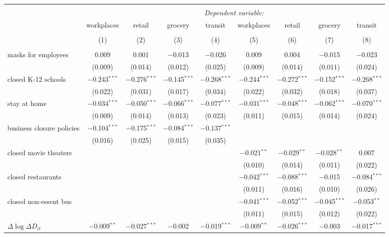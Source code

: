\begin{tabular}{@{\extracolsep{1pt}}lcccccccc} 
\\[-1.8ex]\hline 
\hline \\[-1.8ex] 
 & \multicolumn{8}{c}{\textit{Dependent variable:}} \\ 
\cline{2-9} 
 & workplaces & retail & grocery & transit & workplaces & retail & grocery & transit \\ 
\\[-1.8ex] & (1) & (2) & (3) & (4) & (5) & (6) & (7) & (8)\\ 
\hline \\[-1.8ex] 
 masks for employees & 0.009 & 0.001 & $-$0.013 & $-$0.026 & 0.009 & 0.004 & $-$0.015 & $-$0.023 \\ 
  & (0.009) & (0.014) & (0.012) & (0.025) & (0.009) & (0.014) & (0.011) & (0.024) \\ 
  closed K-12 schools & $-$0.243$^{***}$ & $-$0.276$^{***}$ & $-$0.145$^{***}$ & $-$0.268$^{***}$ & $-$0.244$^{***}$ & $-$0.272$^{***}$ & $-$0.152$^{***}$ & $-$0.268$^{***}$ \\ 
  & (0.022) & (0.031) & (0.017) & (0.034) & (0.022) & (0.032) & (0.018) & (0.037) \\ 
  stay at home & $-$0.034$^{***}$ & $-$0.050$^{***}$ & $-$0.066$^{***}$ & $-$0.077$^{***}$ & $-$0.031$^{***}$ & $-$0.048$^{***}$ & $-$0.062$^{***}$ & $-$0.070$^{***}$ \\ 
  & (0.009) & (0.014) & (0.013) & (0.023) & (0.011) & (0.015) & (0.014) & (0.024) \\ 
  business closure policies & $-$0.104$^{***}$ & $-$0.175$^{***}$ & $-$0.084$^{***}$ & $-$0.137$^{***}$ &  &  &  &  \\ 
  & (0.016) & (0.025) & (0.015) & (0.035) &  &  &  &  \\ 
  closed movie theaters &  &  &  &  & $-$0.021$^{**}$ & $-$0.029$^{**}$ & $-$0.028$^{**}$ & 0.007 \\ 
  &  &  &  &  & (0.010) & (0.014) & (0.011) & (0.022) \\ 
  closed restaurants &  &  &  &  & $-$0.042$^{***}$ & $-$0.088$^{***}$ & $-$0.015 & $-$0.084$^{***}$ \\ 
  &  &  &  &  & (0.011) & (0.016) & (0.010) & (0.026) \\ 
  closed non-essent bus &  &  &  &  & $-$0.041$^{***}$ & $-$0.052$^{***}$ & $-$0.045$^{***}$ & $-$0.053$^{**}$ \\ 
  &  &  &  &  & (0.011) & (0.015) & (0.012) & (0.022) \\ 
  $\Delta \log \Delta D_{it}$ & $-$0.009$^{**}$ & $-$0.027$^{***}$ & $-$0.002 & $-$0.019$^{***}$ & $-$0.009$^{**}$ & $-$0.026$^{***}$ & $-$0.003 & $-$0.017$^{***}$ \\ 

\end{tabular}
